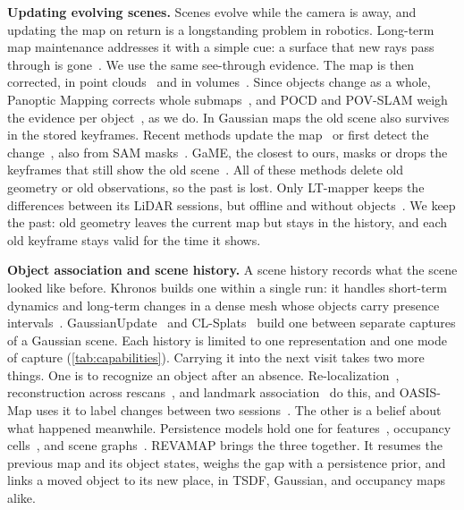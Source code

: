 \documentclass[10pt,twocolumn,letterpaper]{article}
\newcommand{\ours}{REVAMAP\xspace}
\begin{document}
\vspace{0mm}\noindent\textbf{Updating evolving scenes.}
Scenes evolve while the camera is away, and updating the map on return is a longstanding problem in robotics. Long-term map maintenance addresses it with a simple cue: a surface that new rays pass through is gone~\cite{6907397,kim2020removert}. We use the same see-through evidence. The map is then corrected, in point clouds~\cite{8594310,9811916,10802029} and in volumes~\cite{7989614}. Since objects change as a whole, Panoptic Mapping corrects whole submaps~\cite{9811877}, and POCD and POV-SLAM weigh the evidence per object~\cite{Qian-RSS-22,Qian-RSS-23}, as we do. In Gaussian maps the old scene also survives in the stored keyframes. Recent methods update the map~\cite{11097624,fu2025gslts3dgaussiansplattingbased} or first detect the change~\cite{huang2025syngs,galappaththige2026changes,galappaththige2026gsdiff}, also from SAM masks~\cite{Kirillov_2023_ICCV,lu20253dgscd}. GaME, the closest to ours, masks or drops the keyframes that still show the old scene~\cite{Yugay_2026_CVPR}. All of these methods delete old geometry or old observations, so the past is lost. Only LT-mapper keeps the differences between its LiDAR sessions, but offline and without objects~\cite{9811916}. We keep the past: old geometry leaves the current map but stays in the history, and each old keyframe stays valid for the time it shows.

\vspace{0mm}\noindent\textbf{Object association and scene history.}
A scene history records what the scene looked like before. Khronos builds one within a single run: it handles short-term dynamics and long-term changes in a dense mesh whose objects carry presence intervals~\cite{Schmid-RSS-24}. GaussianUpdate~\cite{Zeng_2025_ICCV} and CL-Splats~\cite{Ackermann_2025_ICCV} build one between separate captures of a Gaussian scene. Each history is limited to one representation and one mode of capture (\cref{tab:capabilities}). Carrying it into the next visit takes two more things. One is to recognize an object after an absence. Re-localization~\cite{9010673}, reconstruction across rescans~\cite{Zhu_2024_CVPR}, and landmark association~\cite{10423794} do this, and OASIS-Map uses it to label changes between two sessions~\cite{oh2026oasismapobjectlevelchangedetection}. The other is a belief about what happened meanwhile. Persistence models hold one for features~\cite{7487237,9196913,11247086}, occupancy cells~\cite{DBLP:conf/aaai/Meyer-DeliusBB12,7878680}, and scene graphs~\cite{10161212}. \ours brings the three together. It resumes the previous map and its object states, weighs the gap with a persistence prior, and links a moved object to its new place, in TSDF, Gaussian, and occupancy maps alike.
\end{document}
